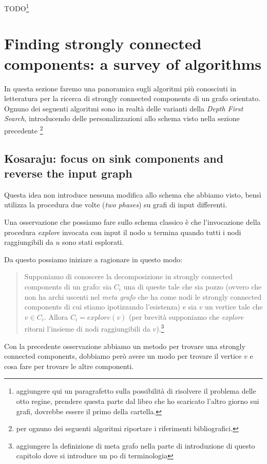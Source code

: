 TODO\footnote{aggiungere qui un paragrafetto sulla possibilit\`a di
  risolvere il problema delle otto regine, prendere questa parte dal
  libro che ho scaricato l'altro giorno sui grafi, dovrebbe essere il
  primo della cartella.}

\section{Finding strongly connected components: a survey of
  algorithms}

In questa sezione faremo una panoramica sugli algoritmi pi\`u
conosciuti in letteratura per la ricerca di strongly connected
components di un grafo orientato. Ognuno dei seguenti algoritmi sono
in realt\`a delle varianti della \emph{Depth First Search},
introducendo delle personalizzazioni allo schema visto nella sezione
precedente \footnote{per ognuno dei seguenti algoritmi riportare i
  riferimenti bibliografici.}

\subsection{Kosaraju: focus on sink components and reverse the input
  graph}
\label{subsection:kosaraju-algorithm}
Questa idea non introduce nessuna modifica allo schema che abbiamo
visto, bens\`i utilizza la procedura due volte (\emph{two phases}) su
grafi di input differenti.

Una osservazione che possiamo fare sullo schema classico \`e che
l'invocazione della procedura \emph{explore} invocata con input il
nodo $u$ termina quando tutti i nodi raggiungibili da $u$ sono stati
esplorati.

Da questo possiamo iniziare a ragionare in questo modo:
\begin{quotation}
  Supponiamo di conoscere la decomposizione in strongly connected
  components di un grafo: sia $C_{i}$ una di queste tale che sia pozzo
  (ovvero che non ha archi uscenti nel \emph{meta grafo} che ha come
  nodi le strongly connected components di cui stiamo ipotizzando
  l'esistenza) e sia $v$ un vertice tale che $v \in C_{i}$. Allora
  $C_{i} = explore(v)$ (per brevit\`a supponiamo che \emph{explore}
  ritorni l'insieme di nodi raggiungibili da $v$).\footnote{aggiungere
    la definizione di meta grafo nella parte di introduzione di questo
    capitolo dove si introduce un po di terminologia}
\end{quotation}

Con la precedente osservazione abbiamo un metodo per trovare una
strongly connected components, dobbiamo per\`o avere un modo per
trovare il vertice $v$ e cosa fare per trovare le altre componenti.

